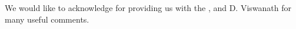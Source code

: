 
We would like to acknowledge for providing us with
the  \eqv, and D. Viswanath for many useful comments.
